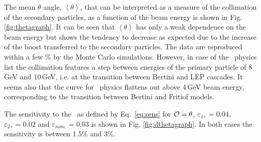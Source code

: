 The mean $\theta$ angle, $\left<\theta\right>$, that can be interpreted as a measure of the collimation of the secondary particles, as a function of the beam energy is shown in Fig. \ref{fig:thetagraph}. 
It can be seen that $\left<\theta\right>$ has only a weak dependence on the beam energy but shows the tendency to decrease as expected due to the increase of the boost transferred to the secondary particles.  The data are reproduced within a few \% by the Monte Carlo simulations. However, in case of the \qgsp\ physics list the collimation features a step between energies of the primary particle of 8\,GeV and 10\,GeV, i.e. at the transition between Bertini and LEP cascades. It seems also that the curve for \ftfp\ physics flattens out above 4\,GeV beam energy, corresponding to the transition between Bertini and Fritiof models.

The sensitivity to the \ep\  as defined by Eq.~\ref{eq:sens} for ${\cal O}=\theta$, $\varepsilon_{1},=0.04$, $\varepsilon_{2},=0.02$ and $\varepsilon_{nom.}=0.03$ is shown in Fig. \ref{fig:dthetagraph}. In both cases the sensitivity is between 1.5\% and 3\%.



